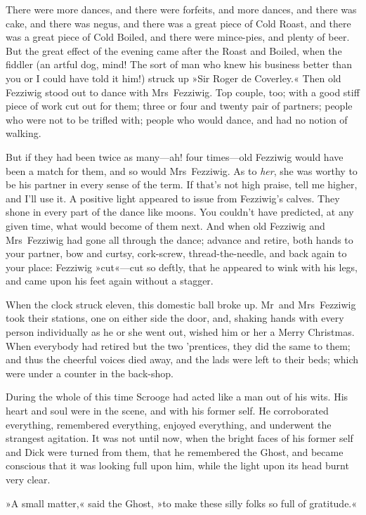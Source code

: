 There were more dances, and there were forfeits, and more dan\-ces, and there was cake, and there was negus, and there was a great piece of Cold Roast, and there was a great piece of Cold Boiled, and there were mince-pies, and plenty of beer. But the great effect of the evening came after the Roast and Boiled, when the fiddler (an artful dog, mind! The sort of man who knew his business better than you or I could have told it him!) struck up »Sir Roger de Coverley.« Then old Fezziwig stood out to dance with Mrs~Fezziwig. Top couple, too; with a good stiff piece of work cut out for them; three or four and twenty pair of partners; people who were not to be trifled with; people who would dance, and had no notion of walking.

But if they had been twice as many---ah! four times---old Fezziwig would have been a match for them, and so would Mrs~Fezziwig. As to \textit{her}, she was worthy to be his partner in every sense of the term. If that's not high praise, tell me higher, and I'll use it. A positive light appeared to issue from Fezziwig's calves. They shone in every part of the dance like moons. You couldn't have predicted, at any given time, what would become of them next. And when old Fezziwig and Mrs~Fezziwig had gone all through the dance; advance and retire, both hands to your partner, bow and curtsy, cork-screw, thread-the-needle, and back again to your place: Fezziwig »cut«---cut so deftly, that he appeared to wink with his legs, and came upon his feet again without a stagger.

When the clock struck eleven, this domestic ball broke up. Mr~and Mrs~Fezziwig took their stations, one on either side the door, and, shaking hands with every person individually as he or she went out, wished him or her a Merry Christmas. When everybody had retired but the two 'prentices, they did the same to them; and thus the cheerful voices died away, and the lads were left to their beds; which were under a counter in the back-shop.

During the whole of this time Scrooge had acted like a man out of his wits. His heart and soul were in the scene, and with his former self. He corroborated everything, remembered everything, enjoyed everything, and underwent the strangest agitation. It was not until now, when the bright faces of his former self and Dick were turned from them, that he remembered the Ghost, and became conscious that it was looking full upon him, while the light upon its head burnt very clear.

»A small matter,« said the Ghost, »to make these silly folks so full of gratitude.«

